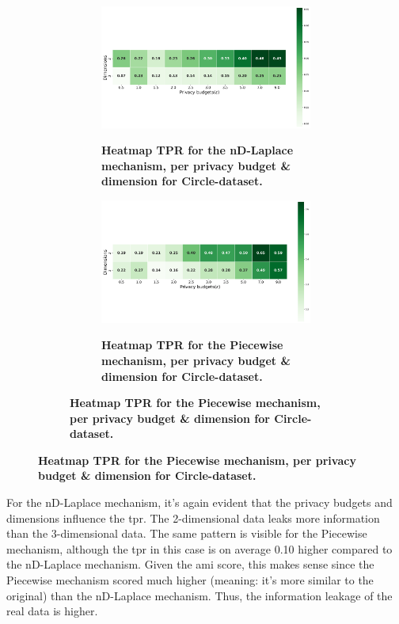 {\newpage
\begin{figure}[H]
    \centering
    \begin{subfigure}[b]{0.9\textwidth}
        \begin{subfigure}[c]{1\textwidth}
            \caption{\textbf{Heatmap TPR for the nD-Laplace mechanism, per privacy budget \& dimension for Circle-dataset.}}
            \includegraphics[width=1\textwidth]{Results/nd-laplace/nd-Laplace/circle-dataset/tpr.png}
            \label{fig:privacy_tpr_circle-dataset_adversial_advantage_kd-laplace}
        \end{subfigure}
        \vfill %

        \begin{subfigure}[c]{1\textwidth}
            \caption{\textbf{Heatmap TPR for the Piecewise mechanism, per privacy budget \& dimension for Circle-dataset.}}
            \includegraphics[width=1\textwidth]{Results/nd-laplace/piecewise/circle-dataset/tpr.png}
            \label{fig:privacy_tpr_circle-dataset_adversial_advantage_piecewise}
        \end{subfigure}
    \end{subfigure}
\end{figure}
For the nD-Laplace mechanism, it's again evident that the privacy budgets and dimensions influence the \gls{tpr}. The 2-dimensional data leaks more information than the 3-dimensional data. The same pattern is visible for the Piecewise mechanism, although the \gls{tpr} in this case is on average 0.10 higher compared to the nD-Laplace mechanism.
Given the \gls{ami} score, this makes sense since the Piecewise mechanism scored much higher (meaning: it's more similar to the original) than the nD-Laplace mechanism. Thus, the information leakage of the real data is higher.
{}
\newpage
}
